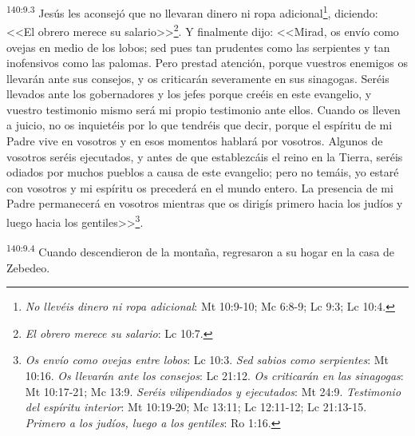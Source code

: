 \par 
\textsuperscript{140:9.3} Jesús les aconsejó que no llevaran dinero ni ropa adicional\footnote{\textit{No llevéis dinero ni ropa adicional}: Mt 10:9-10; Mc 6:8-9; Lc 9:3; Lc 10:4.}, diciendo: <<El obrero merece su salario>>\footnote{\textit{El obrero merece su salario}: Lc 10:7.}. Y finalmente dijo: <<Mirad, os envío como ovejas en medio de los lobos; sed pues tan prudentes como las serpientes y tan inofensivos como las palomas. Pero prestad atención, porque vuestros enemigos os llevarán ante sus consejos, y os criticarán severamente en sus sinagogas. Seréis llevados ante los gobernadores y los jefes porque creéis en este evangelio, y vuestro testimonio mismo será mi propio testimonio ante ellos. Cuando os lleven a juicio, no os inquietéis por lo que tendréis que decir, porque el espíritu de mi Padre vive en vosotros y en esos momentos hablará por vosotros. Algunos de vosotros seréis ejecutados, y antes de que establezcáis el reino en la Tierra, seréis odiados por muchos pueblos a causa de este evangelio; pero no temáis, yo estaré con vosotros y mi espíritu os precederá en el mundo entero. La presencia de mi Padre permanecerá en vosotros mientras que os dirigís primero hacia los judíos y luego hacia los gentiles>>\footnote{\textit{Os envío como ovejas entre lobos}: Lc 10:3. \textit{Sed sabios como serpientes}: Mt 10:16. \textit{Os llevarán ante los consejos}: Lc 21:12. \textit{Os criticarán en las sinagogas}: Mt 10:17-21; Mc 13:9. \textit{Seréis vilipendiados y ejecutados}: Mt 24:9. \textit{Testimonio del espíritu interior}: Mt 10:19-20; Mc 13:11; Lc 12:11-12; Lc 21:13-15. \textit{Primero a los judíos, luego a los gentiles}: Ro 1:16.}.

\par 
\textsuperscript{140:9.4} Cuando descendieron de la montaña, regresaron a su hogar en la casa de Zebedeo.

